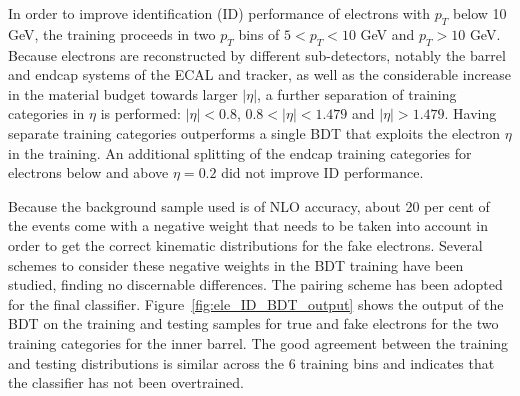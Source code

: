 In order to improve identification (ID) performance of electrons with $p_T$ below 10 GeV, the training proceeds in two $p_T$ bins of $5 < p_T < 10$ GeV and $p_T > 10$ GeV. Because electrons are reconstructed by different sub-detectors, notably the barrel and endcap systems of the ECAL and tracker, as well as the considerable increase in the material budget towards larger $|\eta|$,
a further separation of training categories in $\eta$ is performed: $|\eta| < 0.8$, $0.8 < |\eta| < 1.479$ and $|\eta| > 1.479$. Having separate training categories outperforms a single BDT that exploits the electron $\eta$ in the training. An additional splitting of the endcap training categories for electrons below and above $\eta=0.2$ did not improve ID performance.


Because the background sample used is of NLO accuracy, about 20 per cent of the events come with a negative weight that needs to be taken into account in order to get the correct kinematic distributions for the fake electrons. Several schemes to consider these negative weights in the BDT training have been studied, finding no discernable differences. The pairing scheme has been adopted for the final classifier.
Figure~\ref{fig:ele_ID_BDT_output} shows the output of the BDT on the training and testing samples for true and fake electrons for the two training categories for the inner barrel. The good agreement between the training and testing distributions is similar across the 6 training bins and indicates that the classifier has not been overtrained.

